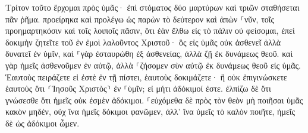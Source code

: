 \documentclass{openreader}
\begin{document}
Τρίτον τοῦτο ἔρχομαι πρὸς ὑμᾶς· ἐπὶ στόματος δύο μαρτύρων καὶ τριῶν σταθήσεται πᾶν ῥῆμα. 
προείρηκα καὶ προλέγω ὡς παρὼν τὸ δεύτερον καὶ ἀπὼν ⸀νῦν, τοῖς προημαρτηκόσιν καὶ τοῖς λοιποῖς πᾶσιν, ὅτι ἐὰν ἔλθω εἰς τὸ πάλιν οὐ φείσομαι, 
ἐπεὶ δοκιμὴν ζητεῖτε τοῦ ἐν ἐμοὶ λαλοῦντος Χριστοῦ· ὃς εἰς ὑμᾶς οὐκ ἀσθενεῖ ἀλλὰ δυνατεῖ ἐν ὑμῖν, 
καὶ ⸀γὰρ ἐσταυρώθη ἐξ ἀσθενείας, ἀλλὰ ζῇ ἐκ δυνάμεως θεοῦ. καὶ γὰρ ἡμεῖς ἀσθενοῦμεν ἐν αὐτῷ, ἀλλὰ ⸀ζήσομεν σὺν αὐτῷ ἐκ δυνάμεως θεοῦ εἰς ὑμᾶς. 
Ἑαυτοὺς πειράζετε εἰ ἐστὲ ἐν τῇ πίστει, ἑαυτοὺς δοκιμάζετε· ἢ οὐκ ἐπιγινώσκετε ἑαυτοὺς ὅτι ⸂Ἰησοῦς Χριστὸς⸃ ἐν ⸀ὑμῖν; εἰ μήτι ἀδόκιμοί ἐστε. 
ἐλπίζω δὲ ὅτι γνώσεσθε ὅτι ἡμεῖς οὐκ ἐσμὲν ἀδόκιμοι. 
⸀εὐχόμεθα δὲ πρὸς τὸν θεὸν μὴ ποιῆσαι ὑμᾶς κακὸν μηδέν, οὐχ ἵνα ἡμεῖς δόκιμοι φανῶμεν, ἀλλ’ ἵνα ὑμεῖς τὸ καλὸν ποιῆτε, ἡμεῖς δὲ ὡς ἀδόκιμοι ὦμεν. 
\end{document}
